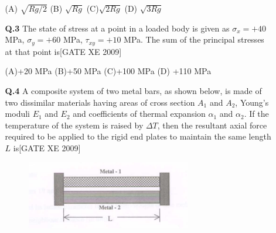 \documentclass[journal,12pt,onecolumn]{IEEEtran}
\theoremstyle{remark}
\begin{document}
\begin{enumerate}
\begin{enumerate}
   (A)  $\sqrt{Rg/2}$  \hfill
   (B)  $\sqrt{Rg}$  \hfill
    (C)$\sqrt{2Rg}$  \hfill 
    (D) $\sqrt{3Rg}$ \hfill


\vspace{1em}

\noindent
\item[\textbf{Q.3}] The state of stress at a point in a loaded body is given as $\sigma_x = +40$ MPa, $\sigma_y = +60$ MPa, $\tau_{xy} = +10$ MPa. The sum of the principal stresses at that point is\hfill[GATE XE 2009]

     (A)+20 MPa \hfill
     (B)+50 MPa  \hfill
     (C)+100 MPa \hfill
    (D) +110 MPa


\vspace{1em}

\noindent
\item[\textbf{Q.4}] A composite system of two metal bars, as shown below, is made of two dissimilar materials having areas of cross section $A_1$ and $A_2$, Young's moduli $E_1$ and $E_2$ and coefficients of thermal expansion $\alpha_1$ and $\alpha_2$. If the temperature of the system is raised by $\Delta T$, then the resultant axial force required to be applied to the rigid end plates to maintain the same length $L$ is\hfill[GATE XE 2009]
\begin{figure}[h]
    \centering
     \includegraphics[width=0.5\columnwidth]{figs/fig8.png}
\end{figure}


\end{enumerate}
\end{enumerate}
\end{document}

